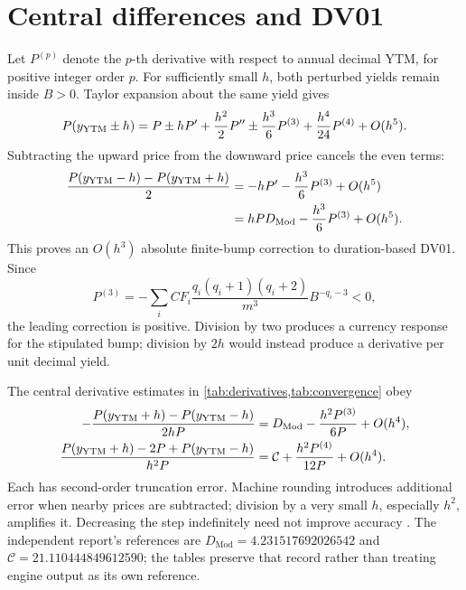 \section{Central differences and DV01}\label{sec:app-dv01}
Let \(P^{(p)}\) denote the \(p\)-th derivative with respect to annual decimal YTM, for positive integer order \(p\). For sufficiently small \(h\), both perturbed yields remain inside \(B>0\). Taylor expansion about the same yield gives
\[
P(y_{\mathrm{YTM}}\pm h)=P\pm hP'+\frac{h^2}{2}P''
 \pm\frac{h^3}{6}P^{(3)}+\frac{h^4}{24}P^{(4)}+O(h^5).
\]
Subtracting the upward price from the downward price cancels the even terms:
\begin{equation}\label{eq:app-dv01}
\begin{split}
\frac{P(y_{\mathrm{YTM}}-h)-P(y_{\mathrm{YTM}}+h)}2
&=-hP'-\frac{h^3}{6}P^{(3)}+O(h^5)\\
&=hPD_{\mathrm{Mod}}-\frac{h^3}{6}P^{(3)}+O(h^5).
\end{split}
\end{equation}
This proves an \(O(h^3)\) absolute finite-bump correction to duration-based DV01. Since
\[
P^{(3)}=-\sum_iCF_i\frac{q_i(q_i+1)(q_i+2)}{m^3}B^{-q_i-3}<0,
\]
the leading correction is positive. Division by two produces a currency response for the stipulated bump; division by \(2h\) would instead produce a derivative per unit decimal yield.

The central derivative estimates in \cref{tab:derivatives,tab:convergence} obey
\begin{align}
-\frac{P(y_{\mathrm{YTM}}+h)-P(y_{\mathrm{YTM}}-h)}{2hP}
 &=D_{\mathrm{Mod}}-\frac{h^2P^{(3)}}{6P}+O(h^4),\label{eq:central-first}\\
\frac{P(y_{\mathrm{YTM}}+h)-2P+P(y_{\mathrm{YTM}}-h)}{h^2P}
 &=\mathcal C+\frac{h^2P^{(4)}}{12P}+O(h^4).\label{eq:central-second}
\end{align}
Each has second-order truncation error. Machine rounding introduces additional error when nearby prices are subtracted; division by a very small \(h\), especially \(h^2\), amplifies it. Decreasing the step indefinitely need not improve accuracy \parencite{higham2002}. The independent report's references are \(D_{\mathrm{Mod}}=4.231517692026542\) and \(\mathcal C=21.110444849612590\); the tables preserve that record rather than treating engine output as its own reference.

